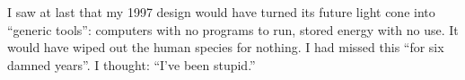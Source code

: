 I saw at last that my 1997 design would have turned its future light cone into ``generic tools'': computers with no programs to run, stored energy with no use. It would have wiped out the human species for nothing. I had missed this ``for six damned years''. I thought: ``I've been stupid.'' 
